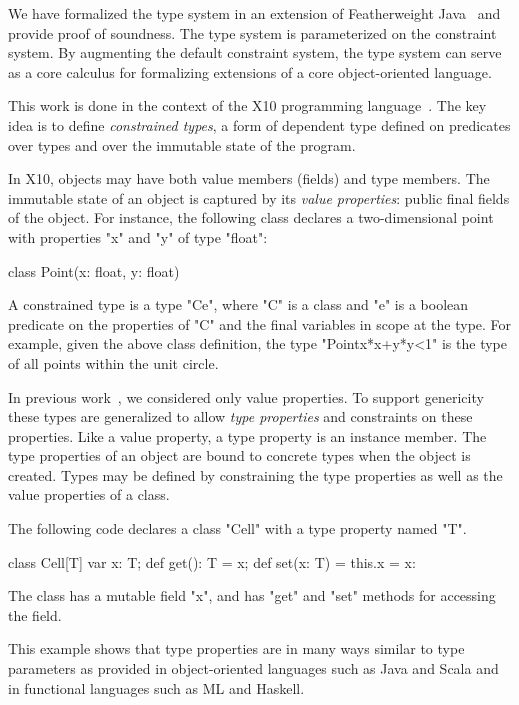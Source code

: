 \documentclass[preprint,nocopyrightspace,9pt]{sigplanconf}
\begin{document}
We have formalized the type system in an extension of
Featherweight Java~\cite{FJ}
and provide proof of soundness.
The type system is parameterized on the constraint system.
By augmenting the default constraint system,
the type system can serve as a core calculus 
for formalizing extensions of a core object-oriented language. 

This work is done in the context of the X10
programming language~\cite{X10}.
The key idea is to define
\emph{constrained types},
a form of dependent type
defined on predicates over types and over the immutable state of
the program.

In X10, objects may have both value members (fields)
and type members.
The immutable state of an object is captured by its
\emph{value properties}: public final fields of the object.
For instance, the following class declares a two-dimensional
point with properties \xcd"x" and \xcd"y" of type \xcd"float":
\begin{xten}
class Point(x: float, y: float) { }
\end{xten}

A constrained type is a type \xcd"C{e}", where \xcd"C" is a
class and \xcd"e" is a boolean predicate on the properties of
\xcd"C" and the final variables in scope at the type.
For example, given the above class definition,
the type \xcd"Point{x*x+y*y<1}" is the type of all
points within the unit circle.

In previous
work~\cite{X10,constrained-types}, we considered
only value properties.
To support genericity these types are generalized
to allow \emph{type properties} and constraints on these properties.
Like a value property, a type property is an instance member.
The type properties of an object are bound to concrete types
when the object is
created.
Types may be defined by constraining the type properties as
well as the value properties of a class.

The following code declares a class \xcd"Cell" with a type
property named \xcd"T".
\begin{xten}
class Cell[T] {
    var x: T;
    def get(): T = x;
    def set(x: T) = { this.x = x: }
}
\end{xten}
The class has a mutable field \xcd"x",
and has \xcd"get" and \xcd"set" methods for accessing the field.

This example shows that type properties are in many ways similar to
type parameters as provided in object-oriented languages such as
Java and Scala and in functional languages such as ML and
Haskell.
\end{document}
